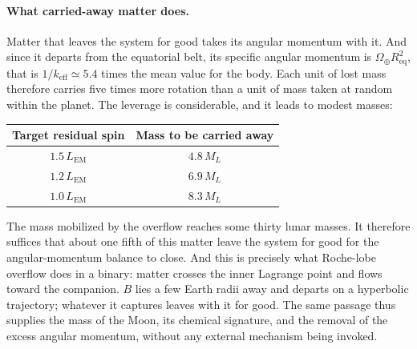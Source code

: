 \documentclass[11pt,a4paper,openany]{report}
\newcommand{\Req}{R_{\mathrm{eq}}}
\begin{document}
\paragraph{What carried-away matter does.} Matter that leaves the system for good takes its angular
momentum with it. And since it departs from the equatorial belt, its specific angular momentum is
$\Omega_\oplus\Req^{2}$, that is $1/k_{\mathrm{eff}}\simeq5.4$ times the mean value for the body.
Each unit of lost mass therefore carries five times more rotation than a unit of mass taken at
random within the planet. The leverage is considerable, and it leads to modest masses:

\begin{center}
\begin{tabular}{cc}
\toprule
\textbf{Target residual spin} & \textbf{Mass to be carried away} \\
\midrule
$1.5\,L_{\mathrm{EM}}$ & $4.8\,M_L$ \\
$1.2\,L_{\mathrm{EM}}$ & $6.9\,M_L$ \\
$1.0\,L_{\mathrm{EM}}$ & $8.3\,M_L$ \\
\bottomrule
\end{tabular}
\end{center}

\begin{ideephys}
The mass mobilized by the overflow reaches some thirty lunar masses. It therefore suffices that
about one fifth of this matter leave the system for good for the angular-momentum balance to close.
And this is precisely what Roche-lobe overflow does in a binary: matter crosses the inner Lagrange
point and flows toward the companion. $B$ lies a few Earth radii away and departs on a hyperbolic
trajectory; whatever it captures leaves with it for good. The same passage thus supplies the mass of
the Moon, its chemical signature, and the removal of the excess angular momentum, without any
external mechanism being invoked.
\end{ideephys}
\end{document}
